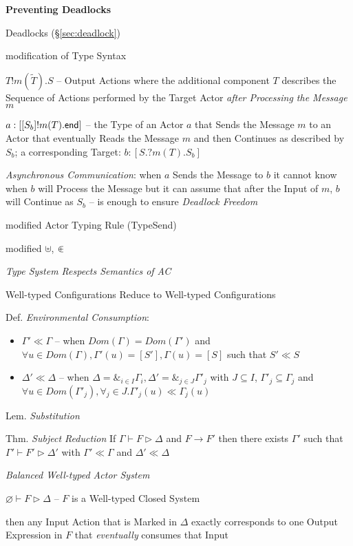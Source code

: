\textbf{Preventing Deadlocks}

\fist Deadlocks (\S\ref{sec:deadlock})

modification of Type Syntax %

$T!m(\tilde{T}).S$ -- Output Actions where the additional component
$T$ describes the Sequence of Actions performed by the Target Actor
\emph{after Processing the Message $m$}

$a : [[S_b]!m(T).\mathsf{end}]$ -- the Type of an Actor $a$ that Sends the
Message $m$ to an Actor that eventually Reads the Message $m$ and then
Continues as described by $S_b$; a corresponding Target: $b :
[S.?m(T).S_b]$

\emph{Asynchronous Communication}: when $a$ Sends the Message to $b$ it
cannot know when $b$ will Process the Message but it can assume that
after the Input of $m$, $b$ will Continue as $S_b$ -- is enough to
ensure \emph{Deadlock Freedom}

modified Actor Typing Rule (TypeSend) %

modified $\uplus$, $\inplus$ %


\emph{Type System Respects Semantics of AC}

Well-typed Configurations Reduce to Well-typed Configurations

Def. \emph{Environmental Consumption}:
\begin{itemize}
  \item $\Gamma' \ll \Gamma$ -- when $Dom(\Gamma) = Dom(\Gamma')$ and
    $\forall u \in Dom(\Gamma), \Gamma'(u) = [S'], \Gamma(u) =
    [S]$ such that $S' \ll S$
  \item $\Delta' \ll \Delta$ -- when $\Delta = \&_{i \in
    I}\Gamma_i,\Delta' = \&_{j \in J}\Gamma'_j$ with $J \subseteq I$,
    $\Gamma'_j \subseteq \Gamma_j$ and $\forall u \in Dom(\Gamma'_j),
    \forall_j \in J.\Gamma'_j(u) \ll \Gamma_j(u)$
\end{itemize}

Lem. \emph{Substitution}

Thm. \emph{Subject Reduction} If $\Gamma \vdash F \rhd \Delta$ and $F
\longrightarrow F'$ then there exists $\Gamma'$ such that $\Gamma'
\vdash F' \rhd \Delta'$ with $\Gamma' \ll \Gamma$ and $\Delta' \ll
\Delta$


\emph{Balanced Well-typed Actor System}

$\varnothing \vdash F \rhd \Delta$ -- $F$ is a Well-typed Closed
System

then any Input Action that is Marked in $\Delta$ exactly corresponds
to one Output Expression in $F$ that \emph{eventually} consumes that
Input

